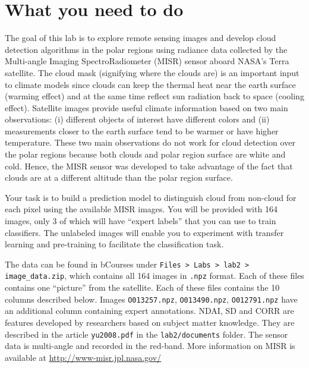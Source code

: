 \documentclass[letterpaper,12pt]{article}
\begin{document}
\section{What you need to do}

The goal of this lab is to explore remote sensing images and develop cloud detection algorithms in the polar regions using radiance data collected by the Multi-angle Imaging SpectroRadiometer (MISR) sensor aboard NASA’s Terra satellite. 
The cloud mask (signifying where the clouds are) is an important input to climate models since clouds can keep the thermal heat near the earth surface (warming effect) and at the same time reflect sun radiation back to space (cooling effect). 
Satellite images provide useful climate information based on two main observations: (i) different objects of interest have different colors and (ii) measurements closer to the earth surface tend to be warmer or have higher temperature. 
These two main observations do not work for cloud detection over the polar regions because both clouds and polar region surface are white and cold. 
Hence, the MISR sensor was developed to take advantage of the fact that clouds are at a different altitude than the polar region surface.

Your task is to build a prediction model to distinguish cloud from non-cloud for each pixel using the available MISR images. 
You will be provided with 164 images, only 3 of which will have ``expert labels'' that you can use to train classifiers. 
The unlabeled images will enable you to experiment with transfer learning and pre-training to facilitate the classification task.

The data can be found in bCourses under \texttt{Files > Labs > lab2 > image\_data.zip}, which contains all 164 images in \texttt{.npz} format.
Each of these files contains one ``picture'' from the satellite. Each of these files contains the 10 columns described below. Images \texttt{O013257.npz}, \texttt{O013490.npz}, \texttt{O012791.npz} have an additional column containing expert annotations. NDAI, SD and CORR are features developed by researchers based on subject matter knowledge. They are described in the article \texttt{yu2008.pdf} in the \texttt{lab2/documents} folder. The sensor data is multi-angle and recorded in the red-band. More information on MISR is available at \url{http://www-misr.jpl.nasa.gov/}
\end{document}
